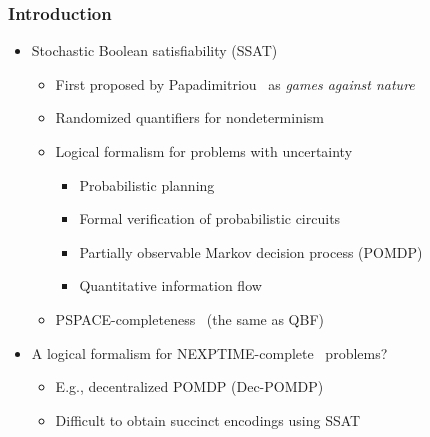\begin{frame}
      \frametitle{Introduction}
      \begin{itemize}
            \item Stochastic Boolean satisfiability (SSAT)
                  \pause
                  \begin{itemize}
                        \item First proposed by Papadimitriou~\cite{Papadimitriou1985} as \emph{games against nature}
                              \pause
                        \item Randomized quantifiers for nondeterminism
                              \pause
                        \item Logical formalism for problems with uncertainty
                              \pause
                              \begin{itemize}
                                    \item Probabilistic planning~\cite{Majercik1998,
                                                Majercik2003,
                                                Majercik2005}
                                          \pause
                                    \item Formal verification of probabilistic circuits~\cite{LeeTC18ProbDesign}
                                          \pause
                                    \item Partially observable Markov decision process (POMDP)~\cite{Salmon2020}
                                          \pause
                                    \item Quantitative information flow~\cite{Fremont2017}
                              \end{itemize}
                              \pause
                        \item PSPACE-completeness~\cite{Stockmeyer1973} (the same as QBF)
                              \pause
                  \end{itemize}
            \item A logical formalism for NEXPTIME-complete~\cite{Peterson1979} problems?
                  \pause
                  \begin{itemize}
                        \item E.g., decentralized POMDP (Dec-POMDP)~\cite{Bernstein2002}
                              \pause
                        \item Difficult to obtain succinct encodings using SSAT
                  \end{itemize}
      \end{itemize}
\end{frame}

